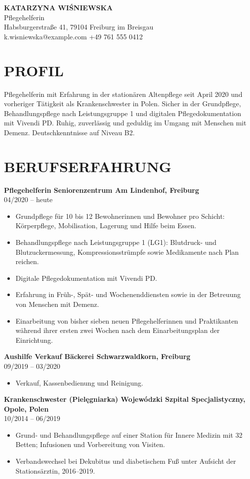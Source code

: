 \documentclass[11pt,a4paper]{article}
\newcommand{\cvsection}[1]{\section*{#1}}
\newcommand{\cvitem}[2]{\noindent\textbf{#1}\\#2\par}
\begin{document}
{\LARGE\bfseries\color{primarycolor} KATARZYNA WIŚNIEWSKA}\\[0.3em]
{\large\color{accentcolor} Pflegehelferin}\\[0.3em]
Habsburgerstraße 41, 79104 Freiburg im Breisgau\\
k.wisniewska@example.com \textbar{} +49 761 555 0412

\cvsection{PROFIL}
Pflegehelferin mit Erfahrung in der stationären Altenpflege seit April 2020 und vorheriger Tätigkeit als Krankenschwester in Polen. Sicher in der Grundpflege, Behandlungspflege nach Leistungsgruppe 1 und digitalen Pflegedokumentation mit Vivendi PD. Ruhig, zuverlässig und geduldig im Umgang mit Menschen mit Demenz. Deutschkenntnisse auf Niveau B2.

\cvsection{BERUFSERFAHRUNG}
\cvitem{Pflegehelferin \textbar{} Seniorenzentrum Am Lindenhof, Freiburg}{04/2020 – heute}
\begin{itemize}
\item Grundpflege für 10 bis 12 Bewohnerinnen und Bewohner pro Schicht: Körperpflege, Mobilisation, Lagerung und Hilfe beim Essen.
\item Behandlungspflege nach Leistungsgruppe 1 (LG1): Blutdruck- und Blutzuckermessung, Kompressionsstrümpfe sowie Medikamente nach Plan reichen.
\item Digitale Pflegedokumentation mit Vivendi PD.
\item Erfahrung in Früh-, Spät- und Wochenenddiensten sowie in der Betreuung von Menschen mit Demenz.
\item Einarbeitung von bisher sieben neuen Pflegehelferinnen und Praktikanten während ihrer ersten zwei Wochen nach dem Einarbeitungsplan der Einrichtung.
\end{itemize}

\cvitem{Aushilfe Verkauf \textbar{} Bäckerei Schwarzwaldkorn, Freiburg}{09/2019 – 03/2020}
\begin{itemize}
\item Verkauf, Kassenbedienung und Reinigung.
\end{itemize}

\cvitem{Krankenschwester (Pielęgniarka) \textbar{} Wojewódzki Szpital Specjalistyczny, Opole, Polen}{10/2014 – 06/2019}
\begin{itemize}
\item Grund- und Behandlungspflege auf einer Station für Innere Medizin mit 32 Betten; Infusionen und Vorbereitung von Visiten.
\item Verbandswechsel bei Dekubitus und diabetischem Fuß unter Aufsicht der Stationsärztin, 2016–2019.
\end{itemize}
\end{document}

